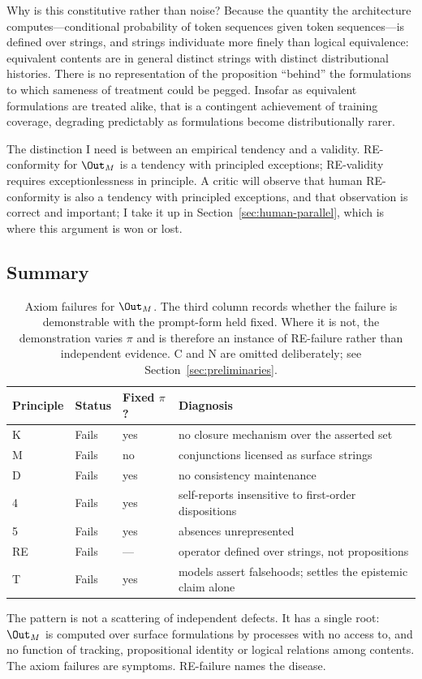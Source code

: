 Why is this constitutive rather than noise? Because the quantity the
architecture computes---conditional probability of token sequences given token
sequences---is defined over strings, and strings individuate more finely than
logical equivalence: equivalent contents are in general distinct strings with
distinct distributional histories. There is no representation of the proposition
``behind'' the formulations to which sameness of treatment could be pegged.
Insofar as equivalent formulations are treated alike, that is a contingent
achievement of training coverage, degrading predictably as formulations become
distributionally rarer.

The distinction I need is between an empirical tendency and a validity.
RE-conformity for $\Out_M$ is a tendency with principled exceptions; RE-validity
requires exceptionlessness in principle. A critic will observe that human
RE-conformity is also a tendency with principled exceptions, and that observation
is correct and important; I take it up in Section~\ref{sec:human-parallel},
which is where this argument is won or lost.

\subsection{Summary}
\label{sec:axiom-summary}

\begin{table}[ht]
  \centering
  \begin{tabular}{@{}llll@{}}
    \toprule
    Principle & Status & Fixed $\pi$? & Diagnosis \\
    \midrule
    K  & Fails & yes & no closure mechanism over the asserted set \\
    M  & Fails & no  & conjunctions licensed as surface strings \\
    D  & Fails & yes & no consistency maintenance \\
    4  & Fails & yes & self-reports insensitive to first-order dispositions \\
    5  & Fails & yes & absences unrepresented \\
    RE & Fails & ---  & operator defined over strings, not propositions \\
    \midrule
    T  & Fails & yes & models assert falsehoods; settles the epistemic claim alone \\
    \bottomrule
  \end{tabular}
  \caption{Axiom failures for $\Out_M$. The third column records whether the
    failure is demonstrable with the prompt-form held fixed. Where it is not,
    the demonstration varies $\pi$ and is therefore an instance of RE-failure
    rather than independent evidence. C and N are omitted deliberately; see
    Section~\ref{sec:preliminaries}.}
  \label{tab:axioms}
\end{table}

The pattern is not a scattering of independent defects. It has a single root:
$\Out_M$ is computed over surface formulations by processes with no access to,
and no function of tracking, propositional identity or logical relations among
contents. The axiom failures are symptoms. RE-failure names the disease.
